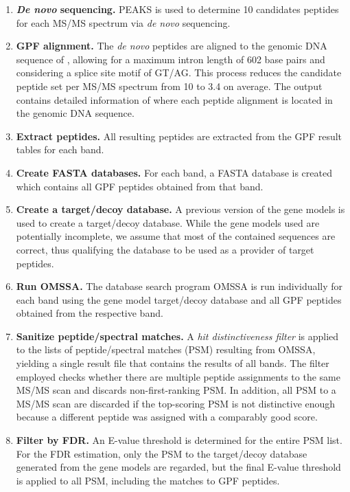 \begin{enumerate}

\item {\bf {\em De novo} sequencing.} 
PEAKS is used to determine 10 candidates peptides for each MS/MS spectrum
via {\em de novo} sequencing.

\item {\bf GPF alignment.} 
The {\em de novo} peptides are aligned to the
genomic DNA sequence of \cre, allowing for a maximum intron length of 602 base
pairs and considering a splice site motif of GT/AG. 
This process reduces the candidate peptide set per MS/MS spectrum from 10 to 
3.4 on average.
The output contains detailed information of where each peptide alignment
is located in the genomic DNA sequence.

\item {\bf Extract peptides.}
All resulting peptides are extracted from the GPF result tables for each band.

\item {\bf Create FASTA databases.}
For each band, a FASTA database is created which contains all GPF peptides 
obtained from that band.

\item {\bf Create a target/decoy database.} 
A previous version of the gene models is used to create a target/decoy database.
While the gene models used are potentially incomplete, we assume that most
of the contained sequences are correct, thus qualifying the database to be
used as a provider of target peptides.

\item {\bf Run OMSSA.} 
The database search program OMSSA is run individually for each band using
the gene model target/decoy database and all GPF peptides obtained from
the respective band.

\item {\bf Sanitize peptide/spectral matches.} 
A {\em hit distinctiveness filter} is applied to the lists of peptide/spectral
matches (PSM) resulting from OMSSA, yielding a single result file that contains
the results of all bands.
The filter employed checks whether there are multiple peptide assignments
to the same MS/MS scan and discards non-first-ranking PSM.
In addition, all PSM to a MS/MS scan are discarded if the top-scoring PSM
is not distinctive enough because a different peptide was assigned with a 
comparably good score.

\item {\bf Filter by FDR.} 
An E-value threshold is determined for the entire PSM list.
For the FDR estimation, only the PSM to the target/decoy database generated
from the gene models are regarded, but the final E-value threshold is applied
to all PSM, including the matches to GPF peptides.


\end{enumerate}
